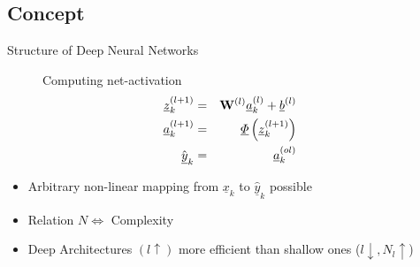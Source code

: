 	\subsection{Concept}
	\begin{frame}[t]{Structure of Deep Neural Networks}
		\begin{figure}
	
		\end{figure}
		
		\begin{minipage}[t]{0.48\linewidth}
		\begin{figure}
			Computing net-activation
			\begin{eqnarray}
				\underline{z}^{(l+1)}_k &=& {\bf W}^{(l)}\underline{a}^{(l)}_k + \underline{b}^{(l)} \nonumber
\\
				\underline{a}^{(l+1)}_k &=& \underline{\Phi} \left ( \underline{z}^{(l+1)}_k \right )
\nonumber\\
				\hat{\underline{y}}_k &=& \underline{a}^{(ol)}_k \nonumber
			\end{eqnarray}
		\end{figure}
		\end{minipage}\hfill
		\begin{minipage}[t]{0.48\linewidth}
			\begin{itemize}
				\item Arbitrary non-linear mapping from $\underline{x}_k$ to  $\hat{\underline{y}}_k$ possible
				\item Relation $N \Leftrightarrow$ Complexity
				\item Deep Architectures $(l \uparrow)$ more efficient than shallow ones ($l\downarrow,
N_l\uparrow$)
			\end{itemize}
		\end{minipage}
		
	\end{frame}
	
